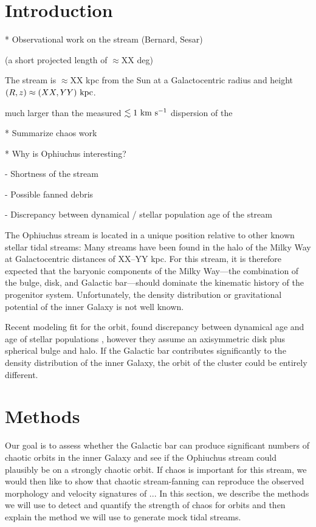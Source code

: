 \documentclass[letterpaper,12pt,preprint]{aastex}
\begin{document}

\section{Introduction}\label{sec:introduction}

* Observational work on the stream (Bernard, Sesar)

(a short projected length of $\approx$XX deg)

The stream is $\approx$XX kpc from the Sun at a Galactocentric radius and height $(R,z) \approx (XX, YY)~{\rm kpc}$.

much larger than the measured $\lesssim 1~{\rm km}~{\rm s}^{-1}$ dispersion of the 

* Summarize chaos work

* Why is Ophiuchus interesting?

- Shortness of the stream

- Possible fanned debris

- Discrepancy between dynamical / stellar population age of the stream

The Ophiuchus stream is located in a unique position relative to other known stellar tidal streams: Many streams have been found in the halo of the Milky Way at Galactocentric distances of XX--YY kpc. For this stream, it is therefore expected that the baryonic components of the Milky Way---the combination of the bulge, disk, and Galactic bar---should dominate the kinematic history of the progenitor system. Unfortunately, the density distribution or gravitational potential of the inner Galaxy is not well known.

Recent modeling fit for the orbit, found discrepancy between dynamical age and age of stellar populations \citep{sesar15}, however they assume an axisymmetric disk plus spherical bulge and halo. If the Galactic bar contributes significantly to the density distribution of the inner Galaxy, the orbit of the cluster could be entirely different.

\section{Methods}\label{sec:method}

Our goal is to assess whether the Galactic bar can produce significant numbers of chaotic orbits in the inner Galaxy and see if the Ophiuchus stream could plausibly be on a strongly chaotic orbit. If chaos is important for this stream, we would then like to show that chaotic stream-fanning can reproduce the observed morphology and velocity signatures of ... In this section, we describe the methods we will use to detect and quantify the strength of chaos for orbits and then explain the method we will use to generate mock tidal streams.
\end{document}
